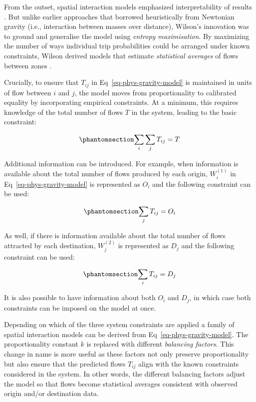 \documentclass[
  10pt,
  letterpaper,
]{article}
\begin{document}
From the outset, spatial interaction models emphasized interpretability
of results
\citep{kirbyNormalizingFactorsGravity1970, wilsonSTATISTICALTHEORYSPATIAL1967, wilson1971}.
But unlike earlier approaches that borrowed heuristically from Newtonian
gravity (i.e., interaction between masses over distance), Wilson's
innovation was to ground and generalise the model using \emph{entropy
maximisation}. By maximizing the number of ways individual trip
probabilities could be arranged under known constraints, Wilson derived
models that estimate \emph{statistical averages} of flows between zones
\citep{wilson1971, seniorGravityModellingEntropy1979}.

Crucially, to ensure that \(T_{ij}\) in Eq~\ref{eq-phys-gravity-model}
is maintained in units of flow between \(i\) and \(j\), the model moves
from proportionality to calibrated equality by incorporating empirical
constraints. At a minimum, this requires knowledge of the total number
of flows \(T\) in the system, leading to the basic constraint:

\begin{equation}\phantomsection\label{eq-constraint0-gravitymodel}{
\sum_i\sum_j T_{ij} = T
}\end{equation}

Additional information can be introduced. For example, when information
is available about the total number of flows produced by each origin,
\(W_i^{(1)}\) in Eq~\ref{eq-phys-gravity-model} is represented as
\(O_i\) and the following constraint can be used:

\begin{equation}\phantomsection\label{eq-constraint1-gravitymodel}{
\sum_j T_{ij} = O_i
}\end{equation}

As well, if there is information available about the total number of
flows attracted by each destination, \(W_j^{(2)}\) is represented as
\(D_j\) and the following constraint can be used:

\begin{equation}\phantomsection\label{eq-constraint2-gravitymodel}{
\sum_i T_{ij} = D_j
}\end{equation}

It is also possible to have information about both \(O_i\) and \(D_j\),
in which case both constraints can be imposed on the model at once.

Depending on which of the three system constraints are applied a family
of spatial interaction models can be derived from
Eq~\ref{eq-phys-gravity-model}. The proportionality constant \(k\) is
replaced with different \emph{balancing factors}. This change in name is
more useful as these factors not only preserve proportionality but also
ensure that the predicted flows \(T_{ij}\) align with the known
constraints considered in the system. In other words, the different
balancing factors adjust the model so that flows become statistical
averages consistent with observed origin and/or destination data.
\end{document}
